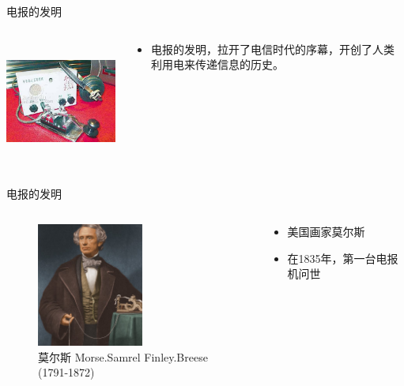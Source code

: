 \documentclass{ctexbeamer}
\begin{document}
\begin{frame}{电报的发明}
  \begin{columns}
    \begin{column}{0.5\linewidth}
      \includegraphics[height=4cm]{dianbao}
    \end{column}
    \begin{column}{0.5\linewidth}
      \begin{itemize}
        \item 电报的发明，拉开了电信时代的序幕，开创了人类利用电来传递信息的历史。
      \end{itemize}
    \end{column}
  \end{columns}
\end{frame}

\begin{frame}{电报的发明}
  \begin{columns}
    \begin{column}{0.5\linewidth}
    \begin{figure}
      \includegraphics[width=3.5cm]{Morse.jpeg}
      \caption{莫尔斯 Morse.Samrel Finley.Breese (1791-1872)}\label{Morse}
    \end{figure}
    \end{column}
    \begin{column}{0.5\linewidth}
      \begin{itemize}
        \item 美国画家莫尔斯
        \item 在1835年，第一台电报机问世
      \end{itemize}
    \end{column}
  \end{columns}
\end{frame}
\end{document}
